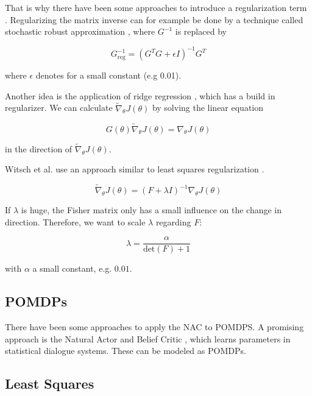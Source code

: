 	That is why there have been some approaches to introduce a regularization term \cite{sohl2012natural}. Regularizing the matrix inverse can for example be done by a technique called stochastic robust approximation \cite{boyd2004convex}, where $G^{-1}$ is replaced by 
	
	\begin{equation}
		G^{-1}_{\text{reg}} = \left( G^T G + \epsilon I \right)^{-1} G^T
	\end{equation}
	
	\noindent where $\epsilon$ denotes for a small constant (e.g 0.01).
	
	Another idea is the application of ridge regression \cite{hoerl1970ridge}, which has a build in regularizer. We can calculate $\widetilde{\nabla}_{\theta} J(\theta)$ by solving the linear equation
	
	\begin{equation}
		G(\theta) \widetilde{\nabla}_{\theta} J(\theta) = \nabla_{\theta} J(\theta)
	\end{equation}
	
	\noindent in the direction of $\widetilde{\nabla}_{\theta} J(\theta)$.
	
	Witsch et al. use an approach similar to least squares regularization \cite{witsch2011enhancing}. 
	
	\begin{equation}
		\widetilde{\nabla}_{\theta} J(\theta) = \left( F + \lambda I \right)^{-1} \nabla_\theta J(\theta)
	\end{equation}
	
	\noindent If $\lambda$ is huge, the Fisher matrix only has a small influence on the change in direction. Therefore, we want to scale $\lambda$ regarding $F$:
	
	\begin{equation}
		\lambda = \dfrac{\alpha}{\text{det}(F) + 1}
	\end{equation}

	\noindent with $\alpha$ a small constant, e.g. $0.01$.
	
	
	\subsection{POMDPs}
	There have been some approaches to apply the NAC to POMDPS. A promising approach is the Natural Actor and Belief Critic \cite{jurvcivcek2011natural}, which learns parameters in statistical dialogue systems. These can be modeled as POMDPs.
	
	\subsection{Least Squares}
	
